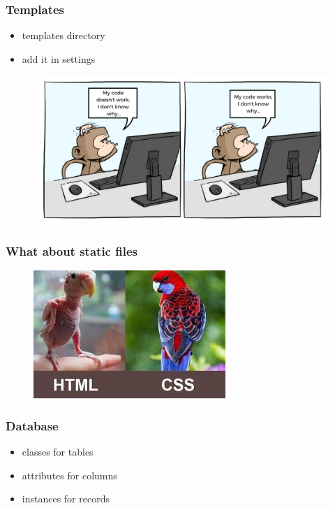 \documentclass{beamer}
\begin{document}
\begin{frame}
	\frametitle{Templates}
	\begin{itemize}
		\item templates directory
		\item add it in settings
	\end{itemize}
\end{frame}

\begin{frame}
\begin{figure}
	\includegraphics[width=0.8\linewidth]{Pics/why.png}
\end{figure}
\end{frame}

\begin{frame}
\frametitle{What about static files}
\begin{figure}
	\includegraphics[width=0.6\linewidth]{Pics/css.jpeg}
\end{figure}
\end{frame}

\begin{frame}
	\frametitle{Database}
	\begin{itemize}
		\centering
		\large
		\item classes for tables
		\item attributes for columns
		\item instances for records		
	\end{itemize}
\end{frame}
\end{document}
